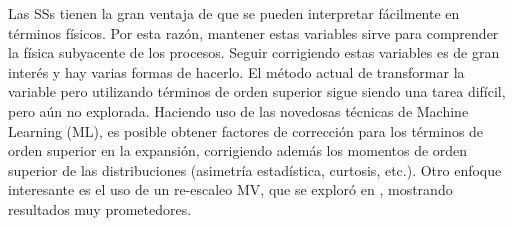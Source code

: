 Las \acfp{SS} tienen la gran ventaja de que se pueden interpretar fácilmente en términos físicos. Por esta razón, mantener estas variables sirve para comprender la física subyacente de los procesos. Seguir corrigiendo estas variables es de gran interés y hay varias formas de hacerlo. El método actual de transformar la variable pero utilizando términos de orden superior sigue siendo una tarea difícil, pero aún no explorada. Haciendo uso de las novedosas técnicas de Machine Learning (ML), es posible obtener factores de corrección para los términos de orden superior en la expansión, corrigiendo además los momentos de orden superior de las distribuciones (asimetría estad\'istica, curtosis, etc.). Otro enfoque interesante es el uso de un re-escaleo \acf{MV}, que se exploró en , mostrando resultados muy prometedores.